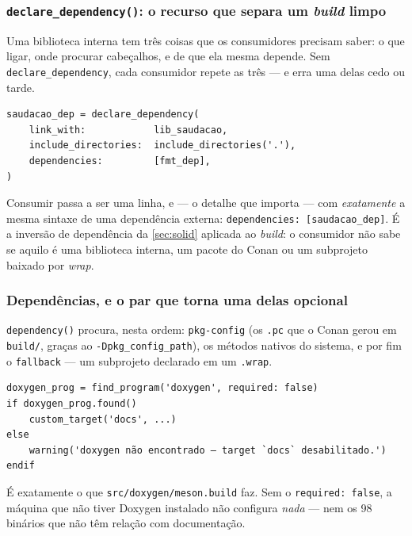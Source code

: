 \subsubsection{\texttt{declare\_dependency()}: o recurso que separa um \emph{build} limpo}

Uma biblioteca interna tem três coisas que os consumidores precisam saber: o que
ligar, onde procurar cabeçalhos, e de que ela mesma depende. Sem
\texttt{declare\_dependency}, cada consumidor repete as três --- e erra uma
delas cedo ou tarde.

\begin{lstlisting}[style=bt, language=Meson,
    caption={O empacotamento, em \texttt{src/meson/meson.build}.}]
saudacao_dep = declare_dependency(
    link_with:            lib_saudacao,
    include_directories:  include_directories('.'),
    dependencies:         [fmt_dep],
)
\end{lstlisting}

Consumir passa a ser uma linha, e --- o detalhe que importa --- com
\emph{exatamente} a mesma sintaxe de uma dependência externa:
\texttt{dependencies: [saudacao\_dep]}. É a inversão de dependência da
\cref{sec:solid} aplicada ao \emph{build}: o consumidor não sabe se aquilo é uma
biblioteca interna, um pacote do Conan ou um subprojeto baixado por
\emph{wrap}.

\subsubsection{Dependências, e o par que torna uma delas opcional}

\texttt{dependency()} procura, nesta ordem: \texttt{pkg-config} (os
\texttt{.pc} que o Conan gerou em \texttt{build/}, graças ao
\texttt{-Dpkg\_config\_path}), os métodos nativos do sistema, e por fim o
\texttt{fallback} --- um subprojeto declarado em um \texttt{.wrap}.

\begin{armadilha}
\begin{lstlisting}[style=bt, language=Meson, frame=none,
                   xleftmargin=0pt, xrightmargin=0pt]
doxygen_prog = find_program('doxygen', required: false)
if doxygen_prog.found()
    custom_target('docs', ...)
else
    warning('doxygen não encontrado — target `docs` desabilitado.')
endif
\end{lstlisting}
É exatamente o que \texttt{src/doxygen/meson.build} faz. Sem o
\texttt{required: false}, a máquina que não tiver Doxygen instalado não
configura \emph{nada} --- nem os 98 binários que não têm relação com
documentação.
\end{armadilha}

